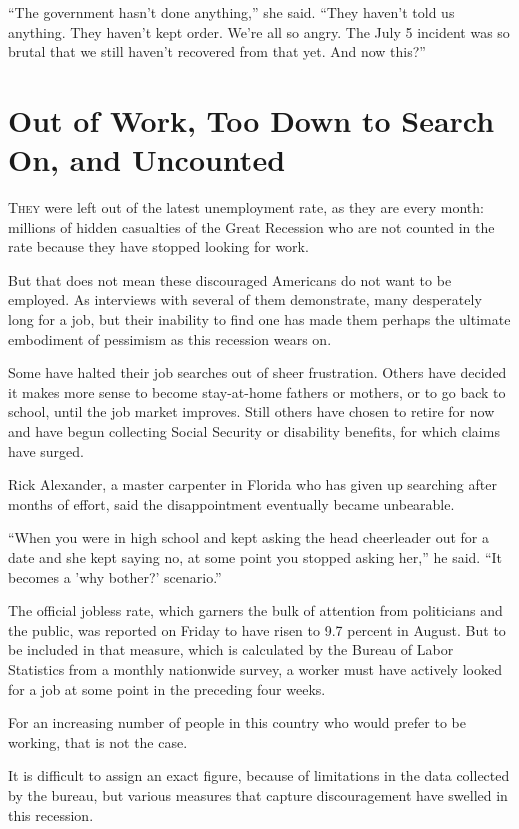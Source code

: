 ﻿\documentclass[12pt]{article}
\begin{document}
``The government hasn't done anything,'' she said. ``They haven't told us anything. They haven't
kept order. We're all so angry. The July 5 incident was so brutal that we still haven't recovered
from that yet. And now this?''

\section{Out of Work, Too Down to Search On, and Uncounted}

\lettrine{T}{hey} were left out of the latest unemployment rate, as they are every month: millions
of hidden casualties\cite{casualty} of the Great Recession who are not counted in the rate because
they have stopped looking for work.

But that does not mean these discouraged Americans do not want to be employed. As interviews with
several of them demonstrate, many desperately long for a job, but their inability to find one has
made them perhaps the ultimate embodiment of pessimism as this recession wears on.

Some have halted their job searches out of sheer frustration. Others have decided it makes more
sense to become stay-at-home fathers or mothers, or to go back to school, until the job market
improves. Still others have chosen to retire for now and have begun collecting Social Security or
disability benefits, for which claims have surged.

Rick Alexander, a master carpenter in Florida who has given up searching after months of effort,
said the disappointment eventually became unbearable.

``When you were in high school and kept asking the head cheerleader out for a date and she kept
saying no, at some point you stopped asking her,'' he said. ``It becomes a 'why bother?' scenario.''

The official jobless rate, which garners the bulk of attention from politicians and the public, was
reported on Friday to have risen to 9.7 percent in August. But to be included in that measure, which
is calculated by the Bureau of Labor Statistics from a monthly nationwide survey, a worker must have
actively looked for a job at some point in the preceding four weeks.

For an increasing number of people in this country who would prefer to be working, that is not the
case.

It is difficult to assign an exact figure, because of limitations in the data collected by the
bureau, but various measures that capture discouragement have swelled in this recession.
\end{document}
